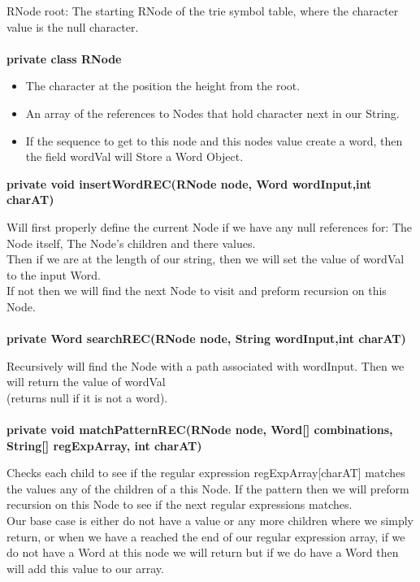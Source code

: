 \documentclass[11pt]{article}
\begin{document}
RNode root: The starting RNode of the trie symbol table, where the character value is the null character.\\\\
\textbf{private class RNode\\}
\begin{itemize}
	\item The character at the position the height from the root.
	\item An array of the references to Nodes that hold character next in our String.
	\item If the sequence to get to this node and this nodes value create a word, then the field wordVal will Store a Word Object.
\end{itemize}
\textbf{private void insertWordREC(RNode node, Word wordInput,int charAT)\\}

Will first properly define the current Node if we have any null references for: The Node itself, The Node's children and there values.\\Then if we are at the length of our string, then we will set the value of wordVal to the input Word. \\ If not then we will find the next Node to visit and preform recursion on this Node.\\\\
%
\textbf{private Word searchREC(RNode node, String wordInput,int charAT)\\}

Recursively will find the Node with a path associated with wordInput. Then we will return the value of wordVal \\(returns null if it is not a word).\\\\
%
\textbf{private void matchPatternREC(RNode node, Word[] combinations, String[] regExpArray, int charAT)\\}

Checks each child to see if the regular expression regExpArray[charAT] matches the values any of the children of a this Node. If the pattern then we will preform recursion on this Node to see if the next regular expressions matches.\\ Our base case is either do not have a value or any more children where we simply return, or when we have a reached the end of our regular expression array, if we do not have a Word at this node we will return but if we do have a Word then will add this value to our array.\\\\
\end{document}
